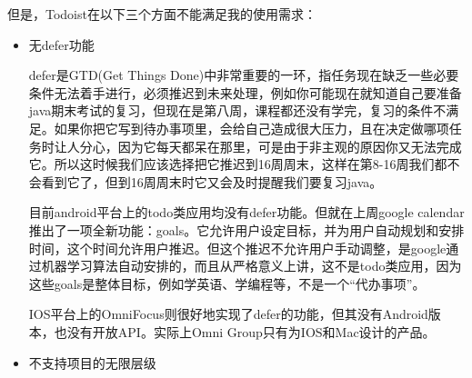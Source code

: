         但是，Todoist在以下三个方面不能满足我的使用需求：
        \begin{itemize}
            \item 无defer功能

                defer是GTD(Get Things Done)中非常重要的一环，指任务现在缺乏一些必要条件无法着手进行，必须推迟到未来处理，例如你可能现在就知道自己要准备java期末考试的复习，但现在是第八周，课程都还没有学完，复习的条件不满足。如果你把它写到待办事项里，会给自己造成很大压力，且在决定做哪项任务时让人分心，因为它每天都呆在那里，可是由于非主观的原因你又无法完成它。所以这时候我们应该选择把它推迟到16周周末，这样在第8-16周我们都不会看到它了，但到16周周末时它又会及时提醒我们要复习java。

                目前android平台上的todo类应用均没有defer功能。但就在上周google calendar推出了一项全新功能：goals。它允许用户设定目标，并为用户自动规划和安排时间，这个时间允许用户推迟。但这个推迟不允许用户手动调整，是google通过机器学习算法自动安排的，而且从严格意义上讲，这不是todo类应用，因为这些goals是整体目标，例如学英语、学编程等，不是一个“代办事项”。

                IOS平台上的OmniFocus则很好地实现了defer的功能，但其没有Android版本，也没有开放API。实际上Omni Group只有为IOS和Mac设计的产品。

            \item 不支持项目的无限层级


\end{itemize}
